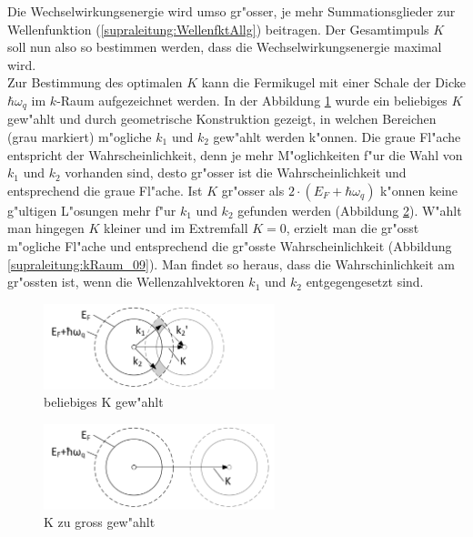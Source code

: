 \begin{refsection}
Die Wechselwirkungsenergie wird umso gr"osser, je mehr Summationsglieder zur Wellenfunktion (\ref{supraleitung:WellenfktAllg}) beitragen. Der Gesamtimpuls $K$ soll nun also so bestimmen werden, dass die Wechselwirkungsenergie maximal wird.
\\
Zur Bestimmung des optimalen $K$ kann die Fermikugel mit einer Schale der Dicke $\hbar\omega_q$ im $k$-Raum aufgezeichnet werden. In der Abbildung \ref{supraleitung:kRaum_05} wurde ein beliebiges $K$ gew"ahlt und durch geometrische Konstruktion gezeigt, in welchen Bereichen (grau markiert) m"ogliche $k_1$ und $k_2$ gew"ahlt werden k"onnen. Die graue Fl"ache entspricht der Wahrscheinlichkeit, denn je mehr M"oglichkeiten f"ur die Wahl von $k_1$ und $k_2$ vorhanden sind, desto gr"osser ist die Wahrscheinlichkeit und entsprechend die graue Fl"ache. Ist $K$ gr"osser als $2\cdot(E_F+\hbar\omega_q)$ k"onnen keine g"ultigen L"osungen mehr f"ur $k_1$ und $k_2$ gefunden werden (Abbildung \ref{supraleitung:kRaum_06}). W"ahlt man hingegen $K$ kleiner und im Extremfall $K=0$, erzielt man die gr"osst m"ogliche Fl"ache und entsprechend die gr"osste Wahrscheinlichkeit (Abbildung \ref{supraleitung:kRaum_09}). Man findet so heraus, dass die Wahrschinlichkeit am gr"ossten ist, wenn die Wellenzahlvektoren $k_1$ und $k_2$ entgegengesetzt sind.
\begin{figure}	
\centering
\includegraphics[width=0.6\textwidth]{supraleitung/kGraphic_05.png} %
\caption{beliebiges K gew"ahlt
\label{supraleitung:kRaum_05}}
\end{figure}
\begin{figure}	
\centering
\includegraphics[width=0.6\textwidth]{supraleitung/kGraphic_06.png} %
\caption{K zu gross gew"ahlt
\label{supraleitung:kRaum_06}}
\end{figure}

\end{refsection}
